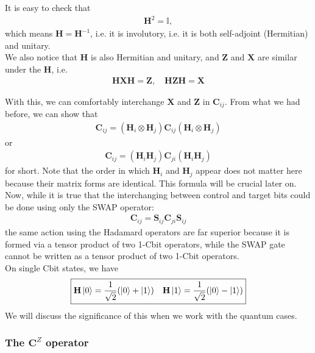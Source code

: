 \documentclass{book}
\theoremstyle{definition}
\newcommand{\X}{\mathbf{X}}
\newcommand{\s}{\mathbf{S}}
\newcommand{\f}[2]{\frac{#1}{#2}}
\newcommand{\Z}{\mathbf{Z}}
\newcommand{\had}{\mathbf{H}}
\begin{document}
It is easy to check that
\begin{align}
\had^2 = \mathbb{I},
\end{align}
which means $\had = \had^{-1}$, i.e. it is involutory, i.e. it is both self-adjoint (Hermitian) and unitary. \\ 

We also notice that $\had$ is also Hermitian and unitary, and $\Z$ and $\X$ are similar under the $\had$, i.e.
\begin{align}
\boxed{\had \X \had  = \Z, \quad \had \Z \had = \X}
\end{align}

With this, we can comfortably interchange $\X$ and $\Z$ in $\mathbf{C}_{ij}$. From what we had before, we can show that
\begin{align}
\boxed{\mathbf{C}_{ij} = (\had_i \otimes \had_j) \mathbf{C}_{ij} (\had_i \otimes \had_j)}
\end{align}
or 
\begin{align}\label{cij}
\boxed{\mathbf{C}_{ij} = (\had_i \had_j)\mathbf{C}_{ji}(\had_i \had_j)}
\end{align}
for short. Note that the order in which $\had_i$ and $\had_j$ appear does not matter here because their matrix forms are identical. This formula will be crucial later on. \\

Now, while it is true that the interchanging between control and target bits could be done using only the SWAP operator:
\begin{align}
\boxed{\mathbf{C}_{ij} = \s_{ij}\mathbf{C}_{ji}\s_{ij}}
\end{align} 
the same action using the Hadamard operators are far superior because it is formed via a tensor product of two 1-Cbit operators, while the SWAP gate cannot be written as a tensor product of two 1-Cbit operators. \\

On single Cbit states, we have
\begin{align}
\boxed{\had \ket{0}= \f{1}{\sqrt{2}}(\ket{0} + \ket{1}) \quad \had \ket{1}= \f{1}{\sqrt{2}}(\ket{0} - \ket{1}) }
\end{align}
We will discuss the significance of this when we work with the quantum cases. 

\subsubsection{The $\mathbf{C}^Z$ operator}
\end{document}
